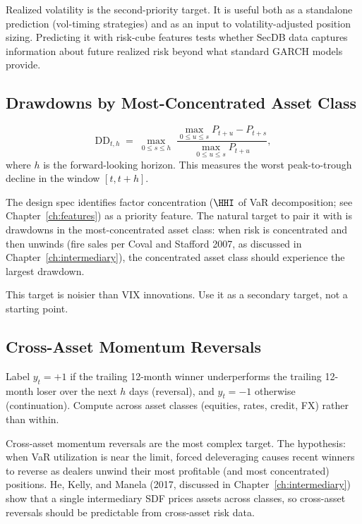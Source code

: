 Realized volatility is the second-priority target.
It is useful both as a standalone prediction (vol-timing strategies)
and as an input to volatility-adjusted position sizing.
Predicting it with risk-cube features tests whether SecDB data
captures information about future realized risk beyond what
standard GARCH models provide.

\subsection{Drawdowns by Most-Concentrated Asset Class}

\begin{definition}
\begin{equation}
\label{eq:drawdown}
\text{DD}_{t,h} \;=\; \max_{0 \leq s \leq h}\;
\frac{\max_{0 \leq u \leq s} P_{t+u} - P_{t+s}}{\max_{0 \leq u \leq s} P_{t+u}},
\end{equation}
where $h$ is the forward-looking horizon.
This measures the worst peak-to-trough decline in the window $[t, t+h]$.
\end{definition}

The design spec identifies factor concentration ($\HHI$ of VaR
decomposition; see Chapter~\ref{ch:features}) as a priority feature.
The natural target to pair it with is drawdowns in the most-concentrated
asset class: when risk is concentrated and then unwinds (fire sales
per Coval and Stafford 2007, as discussed in Chapter~\ref{ch:intermediary}),
the concentrated asset class should experience the largest drawdown.

This target is noisier than VIX innovations.
Use it as a secondary target, not a starting point.

\subsection{Cross-Asset Momentum Reversals}

\begin{definition}
Label $y_t = +1$ if the trailing 12-month winner underperforms
the trailing 12-month loser over the next $h$ days (reversal), and
$y_t = -1$ otherwise (continuation).
Compute across asset classes (equities, rates, credit, FX)
rather than within.
\end{definition}

Cross-asset momentum reversals are the most complex target.
The hypothesis: when VaR utilization is near the limit, forced
deleveraging causes recent winners to reverse as dealers unwind
their most profitable (and most concentrated) positions.
He, Kelly, and Manela (2017, discussed in Chapter~\ref{ch:intermediary})
show that a single intermediary SDF prices assets across classes,
so cross-asset reversals should be predictable from cross-asset
risk data.

